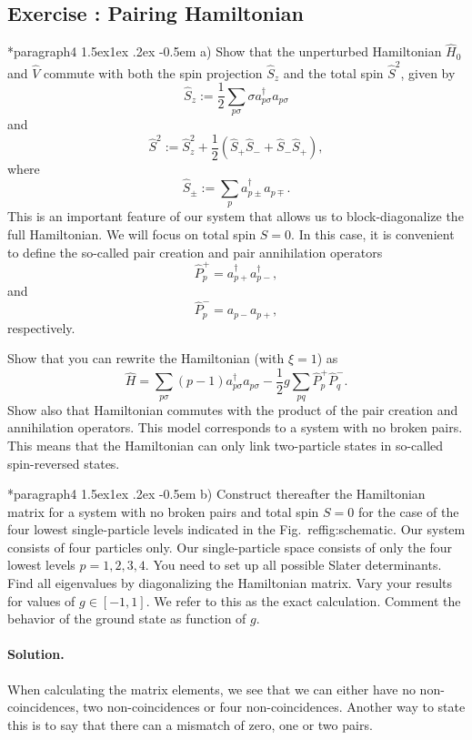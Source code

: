 \documentclass[%
twoside,                 %
final,                   %
10pt]{article}
\makeatletter
\newenvironment{doconceexercise}{}{}
\newcounter{doconceexercisecounter}
\newcommand\subex{\@startsection*{paragraph}{4}{\z@}%
                  {1.5ex\@plus1ex \@minus.2ex}%
                  {-0.5em}%
                  {\normalfont\normalsize\bfseries}}
\makeatother
\begin{document}
\begin{doconceexercise}

\subsection*{Exercise \thedoconceexercisecounter: Pairing Hamiltonian}



\subex{a)}
Show that the unperturbed Hamiltonian $\hat{H}_0$ and $\hat{V}$
  commute with both the spin projection $\hat{S}_z$ and the total spin
  $\hat{S}^2$, given by
\[
  \hat{S}_z := \frac{1}{2}\sum_{p\sigma} \sigma
  a^\dag_{p\sigma}a_{p\sigma}
\]
and
\[
  \hat{S}^2 := \hat{S}_z^2 + \frac{1}{2}(\hat{S}_+\hat{S}_- +
  \hat{S}_-\hat{S}_+),
\]
where
\[
  \hat{S}_\pm := \sum_{p} a^\dag_{p\pm} a_{p\mp}.
\]
This is an important feature of our system that allows us to
block-diagonalize the full Hamiltonian. We will focus on total spin
$S=0$.  In this case, it is convenient to define the so-called pair
creation and pair annihilation operators
\[
\hat{P}^{+}_p = a^\dag_{p+}a^\dag_{p-},
\]
and
\[
\hat{P}^{-}_p = a_{p-}a_{p+},
\] 
respectively.

Show that you can rewrite the Hamiltonian (with $\xi=1$) as
\[
\hat{H}=\sum_{p\sigma}(p-1)a_{p\sigma}^{\dagger}a_{p\sigma}
-\frac{1}{2}g\sum_{pq}\hat{P}^{+}_p\hat{P}^{-}_q.
\]
Show also that Hamiltonian commutes with the product of the pair
creation and annihilation operators.  This model corresponds to a
system with no broken pairs. This means that the Hamiltonian can only
link two-particle states in so-called spin-reversed states.


\subex{b)}
Construct thereafter the Hamiltonian matrix for a system with no
  broken pairs and total spin $S=0$ for the case of the four lowest
  single-particle levels indicated in the
  Fig.~ref{fig:schematic}. Our system consists of four particles
  only.  Our single-particle space consists of only the four lowest
  levels $p=1,2,3,4$.  You need to set up all possible Slater
  determinants.  Find all eigenvalues by diagonalizing the Hamiltonian
  matrix.  Vary your results for values of $g\in [-1,1]$.  We refer to
  this as the exact calculation. Comment the behavior of the ground
  state as function of $g$.


\paragraph{Solution.}
When calculating the matrix elements, we see that we can either have no non-coincidences, two non-coincidences or four non-coincidences. Another way to state this is to say that there can a mismatch of zero, one or two pairs. 


\end{doconceexercise}
\end{document}

